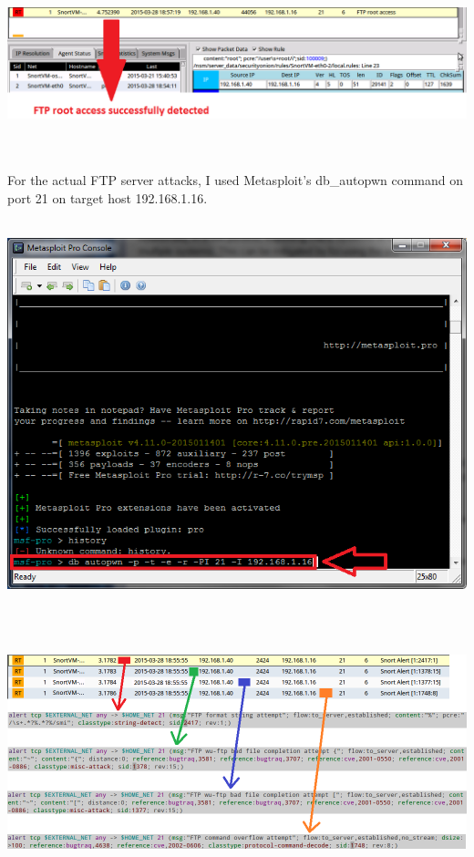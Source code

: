 \documentclass[11pt, a4paper]{article}
\begin{document}
$\;$ \\ \\
\noindent\begin{minipage}{\textwidth}
    \centering
    \includegraphics[width=\textwidth]{FTP_3.png}
\end{minipage}
$\;$ \\ \\
For the actual FTP server attacks, I used Metasploit's db\_autopwn command on port 21 on target host 192.168.1.16. \\ \\
\noindent\begin{minipage}{\textwidth}
    \centering
    \includegraphics[width=\textwidth]{FTP_6.png}
\end{minipage}
$\;$ \\ \\
\noindent\begin{minipage}{\textwidth}
    \centering
    \includegraphics[width=\textwidth]{FTP_5.png}
\end{minipage}
\end{document}
